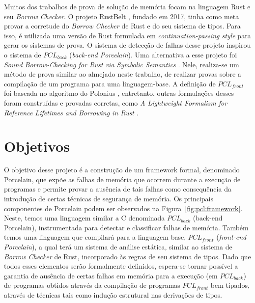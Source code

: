 Muitos dos trabalhos de prova de solução de memória focam na linguagem Rust e seu \emph{Borrow Checker}. O projeto RustBelt \cite{RUSTBELT}, fundado em 2017, tinha como meta provar a corretude do \emph{Borrow Checker} de Rust e do seu sistema de tipos. Para isso, é utilizada uma versão de Rust formulada em \emph{continuation-passing style} para gerar os sistemas de prova. O sistema de detecção de falhas desse projeto inspirou o sistema de $PCL_{back}$ (\emph{back-end Porcelain}). Uma alternativa a esse projeto foi \emph{Sound Borrow-Checking for Rust via Symbolic Semantics} \cite{RUSTSYMBOLIC}. Nele, realiza-se um método de prova similar ao almejado neste trabalho, de realizar provas sobre a compilação de um programa para uma linguagem-base. A definição de $PCL_{front}$ foi baseada no algoritmo do Polonius \cite{Stjerna1684081}, entretanto, outras formulações desses foram construídas e provadas corretas, como \emph{A Lightweight Formalism for Reference Lifetimes and Borrowing in Rust} \cite{RUSTFORMALISM}. 

\section{Objetivos}

O objetivo desse projeto é a construção de um framework formal, denominado Porcelain,  que expõe as falhas de memória que ocorrem durante a execução de programas e permite provar a ausência de tais falhas como consequência da introdução de certas técnicas de segurança de memória. Os principais componentes de Porcelain podem ser observados na Figura~\ref{fig:pcl:framework}. Neste, temos uma linguagem similar a C denominada $PCL_{back}$ (back-end Porcelain), instrumentada para detectar e classificar falhas de memória. Também temos uma linguagem que compilará para a linguagem base, $PCL_{front}$ (\emph{front-end Porcelain}), a qual terá um sistema de análise estática, similar ao sistema de \emph{Borrow Checker} de Rust, incorporado às regras de seu sistema de tipos. Dado que todos esses elementos serão formalmente definidos, espera-se tornar possível a garantia de ausência de certas falhas em memória para a execução (em $PCL_{back}$) de programas obtidos através da compilação de programas  $PCL_{front}$ bem tipados, através de técnicas tais como indução estrutural nas derivações de tipos. 


